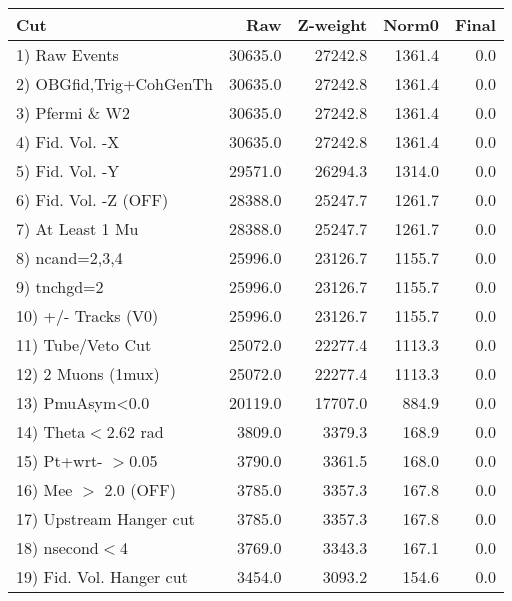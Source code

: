  \begin{table}[h!]\centering
 \begin{tabular}{||l||r|r|r|r||}
 \hline
 \hline
 Cut & Raw & Z-weight & Norm0 & Final \\
 \hline
  1) Raw Events           &     30635.0 &     27242.8 &      1361.4 &         0.0 \\
  2) OBGfid,Trig+CohGenTh &     30635.0 &     27242.8 &      1361.4 &         0.0 \\
  3) Pfermi \& W2         &     30635.0 &     27242.8 &      1361.4 &         0.0 \\
  4) Fid. Vol. -X         &     30635.0 &     27242.8 &      1361.4 &         0.0 \\
  5) Fid. Vol. -Y         &     29571.0 &     26294.3 &      1314.0 &         0.0 \\
  6) Fid. Vol. -Z (OFF)   &     28388.0 &     25247.7 &      1261.7 &         0.0 \\
  7) At Least 1 Mu        &     28388.0 &     25247.7 &      1261.7 &         0.0 \\
  8) ncand=2,3,4          &     25996.0 &     23126.7 &      1155.7 &         0.0 \\
  9) tnchgd=2             &     25996.0 &     23126.7 &      1155.7 &         0.0 \\
 10) +/- Tracks (V0)      &     25996.0 &     23126.7 &      1155.7 &         0.0 \\
 11) Tube/Veto Cut        &     25072.0 &     22277.4 &      1113.3 &         0.0 \\
 12) 2 Muons (1mux)       &     25072.0 &     22277.4 &      1113.3 &         0.0 \\
 13) PmuAsym<0.0          &     20119.0 &     17707.0 &       884.9 &         0.0 \\
 14) Theta$<$2.62 rad     &      3809.0 &      3379.3 &       168.9 &         0.0 \\
 15) Pt+wrt- $>$0.05      &      3790.0 &      3361.5 &       168.0 &         0.0 \\
 16) Mee $>$ 2.0  (OFF)   &      3785.0 &      3357.3 &       167.8 &         0.0 \\
 17) Upstream Hanger cut  &      3785.0 &      3357.3 &       167.8 &         0.0 \\
 18) nsecond$<$4          &      3769.0 &      3343.3 &       167.1 &         0.0 \\
 19) Fid. Vol. Hanger cut &      3454.0 &      3093.2 &       154.6 &         0.0 \\

\end{tabular}
\end{table}

